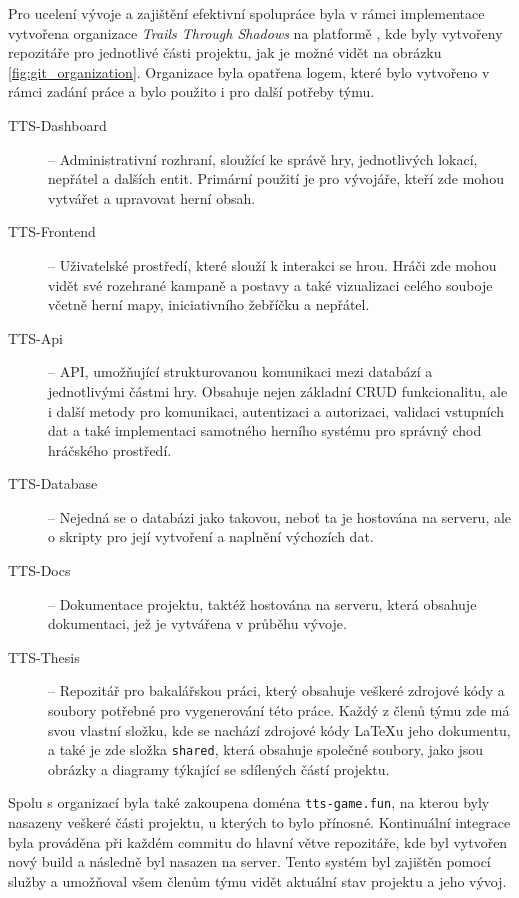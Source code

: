 Pro ucelení vývoje a zajištění efektivní spolupráce byla v rámci implementace vytvořena organizace \textit{Trails Through Shadows} na platformě , kde byly vytvořeny repozitáře pro jednotlivé části projektu, jak je možné vidět na obrázku \ref{fig:git_organization}. Organizace byla opatřena logem, které bylo vytvořeno v rámci zadání práce a bylo použito i pro další potřeby týmu.

\begin{description}
    \item [TTS-Dashboard] -- Administrativní rozhraní, sloužící ke správě hry, jednotlivých lokací, nepřátel a dalších entit. Primární použití je pro vývojáře, kteří zde mohou vytvářet a upravovat herní obsah.
    \item [TTS-Frontend] -- Uživatelské prostředí, které slouží k interakci se hrou. Hráči zde mohou vidět své rozehrané kampaně a postavy a také vizualizaci celého souboje včetně herní mapy, iniciativního žebříčku a nepřátel.
    \item [TTS-Api] -- API, umožňující strukturovanou komunikaci mezi databází a jednotlivými částmi hry. Obsahuje nejen základní CRUD funkcionalitu, ale i další metody pro komunikaci, autentizaci a autorizaci, validaci vstupních dat a také implementaci samotného herního systému pro správný chod hráčského prostředí.
    \item [TTS-Database] -- Nejedná se o databázi jako takovou, neboť ta je hostována na serveru, ale o skripty pro její vytvoření a naplnění výchozích dat.
    \item [TTS-Docs] -- Dokumentace projektu, taktéž hostována na serveru, která obsahuje dokumentaci, jež je vytvářena v průběhu vývoje.
    \item [TTS-Thesis] -- Repozitář pro bakalářskou práci, který obsahuje veškeré zdrojové kódy a soubory potřebné pro vygenerování této práce. Každý z členů týmu zde má svou vlastní složku, kde se nachází zdrojové kódy \LaTeX{u} jeho dokumentu, a také je zde složka \texttt{shared}, která obsahuje společné soubory, jako jsou obrázky a diagramy týkající se sdílených částí projektu. 
\end{description}

Spolu s organizací byla také zakoupena doména \texttt{tts-game.fun}, na kterou byly nasazeny veškeré části projektu, u kterých to bylo přínosné. Kontinuální integrace byla prováděna při každém commitu do hlavní větve repozitáře, kde byl vytvořen nový build a následně byl nasazen na server. Tento systém byl zajištěn pomocí služby  a umožňoval všem členům týmu vidět aktuální stav projektu a jeho vývoj.

